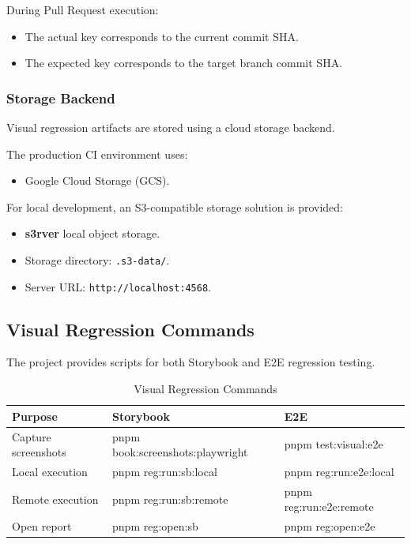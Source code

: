 During Pull Request execution:

\begin{itemize}
    \item The actual key corresponds to the current commit SHA.
    \item The expected key corresponds to the target branch commit SHA.
\end{itemize}


\subsubsection{Storage Backend}

Visual regression artifacts are stored using a cloud storage backend.

The production CI environment uses:

\begin{itemize}
    \item Google Cloud Storage (GCS).
\end{itemize}

For local development, an S3-compatible storage solution is provided:

\begin{itemize}
    \item \textbf{s3rver} local object storage.
    \item Storage directory: \texttt{.s3-data/}.
    \item Server URL: \texttt{http://localhost:4568}.
\end{itemize}


\subsection{Visual Regression Commands}

The project provides scripts for both Storybook and E2E regression testing.

\begin{table}[H]
\centering
\caption{Visual Regression Commands}
\begin{tabular}{|p{5cm}|p{4cm}|p{4cm}|}
\hline
\textbf{Purpose} & \textbf{Storybook} & \textbf{E2E} \\
\hline
Capture screenshots &
pnpm book:screenshots:playwright &
pnpm test:visual:e2e
\\
\hline

Local execution &
pnpm reg:run:sb:local &
pnpm reg:run:e2e:local
\\
\hline

Remote execution &
pnpm reg:run:sb:remote &
pnpm reg:run:e2e:remote
\\
\hline

Open report &
pnpm reg:open:sb &
pnpm reg:open:e2e
\\
\hline
\end{tabular}
\end{table}


